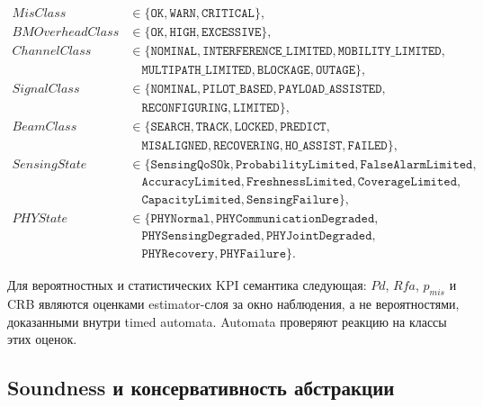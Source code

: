 \documentclass[10pt,a4paper]{article}
\newcommand{\code}[1]{\texttt{#1}}
\begin{document}
\begin{align}
MisClass&\in\{\code{OK},\code{WARN},\code{CRITICAL}\},\\
BMOverheadClass&\in\{\code{OK},\code{HIGH},\code{EXCESSIVE}\},\\
ChannelClass&\in\{\code{NOMINAL},\code{INTERFERENCE\_LIMITED},\code{MOBILITY\_LIMITED},\\
&\quad\code{MULTIPATH\_LIMITED},\code{BLOCKAGE},\code{OUTAGE}\},\\
SignalClass&\in\{\code{NOMINAL},\code{PILOT\_BASED},\code{PAYLOAD\_ASSISTED},\\
&\quad\code{RECONFIGURING},\code{LIMITED}\},\\
BeamClass&\in\{\code{SEARCH},\code{TRACK},\code{LOCKED},\code{PREDICT},\\
&\quad\code{MISALIGNED},\code{RECOVERING},\code{HO\_ASSIST},\code{FAILED}\},\\
SensingState&\in\{\code{SensingQoSOk},\code{ProbabilityLimited},\code{FalseAlarmLimited},\\
&\quad\code{AccuracyLimited},\code{FreshnessLimited},\code{CoverageLimited},\\
&\quad\code{CapacityLimited},\code{SensingFailure}\},\\
PHYState&\in\{\code{PHYNormal},\code{PHYCommunicationDegraded},\\
&\quad\code{PHYSensingDegraded},\code{PHYJointDegraded},\\
&\quad\code{PHYRecovery},\code{PHYFailure}\}.
\end{align}

Для вероятностных и статистических KPI семантика следующая: \(Pd\), \(Rfa\), \(p_{mis}\) и CRB являются оценками estimator-слоя за окно наблюдения, а не вероятностями, доказанными внутри timed automata. Automata проверяют реакцию на классы этих оценок.

\subsection{Soundness и консервативность абстракции}
\end{document}
